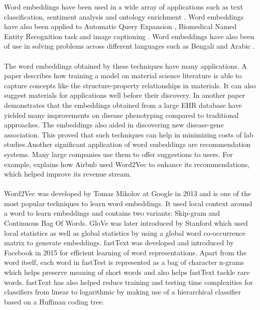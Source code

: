 \documentclass[format=acmsmall,review=true,screen=true]{acmart}
\begin{document}
    Word embeddings have been used in a wide array of applications such as text classification, sentiment analysis and ontology enrichment \cite{RaoS16,sentanalysis,Pembeci2016UsingWE}. Word embeddings have also been applied to Automatic Query Expansion \cite{RoyPMG16}, Biomedical Named Entity Recognition task \cite{chang2015application} and image captioning \cite{10.1145/2964284.2964299}. Word embeddings have also been of use in solving problems across different languages such as Bengali \cite{ahmad2016bengali} and Arabic \cite{7841054}.\\\\
    The word embeddings obtained by these techniques have many applications. A paper \cite{tshitoyan2019unsupervised} describes how training a model on material science literature is able to capture concepts like the structure-property relationships in materials. It can also suggest materials for applications well before their discovery. In another paper \cite{gligorijevic2016large} demonstrates that the embeddings obtained from a large EHR database have yielded many improvements on disease phenotyping compared to traditional approaches. The embeddings also aided in discovering new disease-gene association. This proved that such techniques can help in minimizing costs of lab studies.Another significant application of word embeddings are recommendation systems. Many large companies use them to offer suggestions to users. For example, \cite{grbovic2018real} explains how Airbnb used Word2Vec to enhance its recommendations, which helped improve its revenue stream.\\\\
    Word2Vec \cite{mikolov2013distributed} was developed by Tomas Mikolov at Google in 2013 and is one of the most popular techniques to learn word embeddings. It used local context around a word to learn embeddings and contains two variants: Skip-gram and Continuous Bag Of Words. GloVe \cite{pennington2014glove} was later introduced by Stanford which used local statistics as well as global statistics by using a global word co-occurrence matrix to generate embeddings. fastText \cite{arm2016bag} was developed and introduced by Facebook in 2015 for efficient learning of word representations. Apart from the word itself, each word in fastTest is represented as a bag of character n-grams which helps preserve meaning of short words and also helps fastText tackle rare words. fastText has also helped reduce training and testing time complexities for classifiers from linear to logarithmic by making use of a hierarchical classifier based on a Huffman coding tree.\\\\
\end{document}
